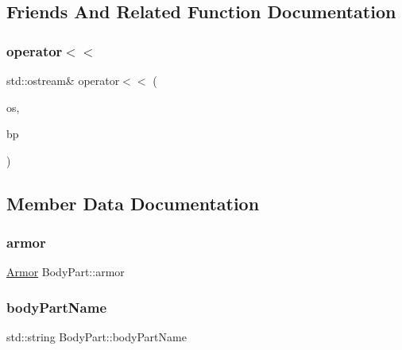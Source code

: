 \subsection{Friends And Related Function Documentation}
\mbox{\label{class_body_part_a816ee6d41ee84f770c140a51243cc152}} 
\subsubsection{\texorpdfstring{operator$<$$<$}{operator<<}}
{\footnotesize\ttfamily std\+::ostream\& operator$<$$<$ (\begin{DoxyParamCaption}\item[{std\+::ostream \&}]{os,  }\item[{const \mbox{\hyperlink{class_body_part}{Body\+Part}} \&}]{bp }\end{DoxyParamCaption})\hspace{0.3cm}{\ttfamily [friend]}}



\subsection{Member Data Documentation}
\mbox{\label{class_body_part_a586f1edeb69d40a0894063f6ccc7604b}} 
\subsubsection{\texorpdfstring{armor}{armor}}
{\footnotesize\ttfamily \mbox{\hyperlink{class_armor}{Armor}} Body\+Part\+::armor\hspace{0.3cm}{\ttfamily [private]}}

\mbox{\label{class_body_part_a403c7265219ff1f7a6ced3bb86dd67d4}} 
\subsubsection{\texorpdfstring{body\+Part\+Name}{bodyPartName}}
{\footnotesize\ttfamily std\+::string Body\+Part\+::body\+Part\+Name\hspace{0.3cm}{\ttfamily [private]}}

